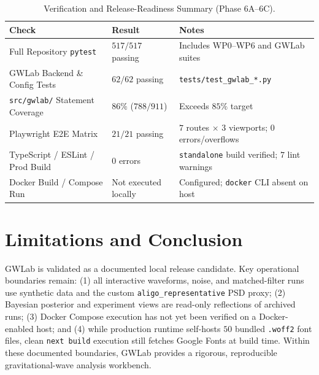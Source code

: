 \documentclass[11pt,a4paper]{article}
\begin{document}
\begin{table}[H]
    \centering
    \caption{Verification and Release-Readiness Summary (Phase 6A--6C).}
    \label{tab:validation}
    \begin{tabular}{lll}
        \toprule
        \textbf{Check} & \textbf{Result} & \textbf{Notes} \\
        \midrule
        Full Repository \texttt{pytest} & $517/517$ passing & Includes WP0--WP6 and GWLab suites \\
        GWLab Backend \& Config Tests & $62/62$ passing & \texttt{tests/test\_gwlab\_*.py} \\
        \texttt{src/gwlab/} Statement Coverage & $86\%$ ($788/911$) & Exceeds $85\%$ target \\
        Playwright E2E Matrix & $21/21$ passing & $7$ routes $\times$ $3$ viewports; $0$ errors/overflows \\
        TypeScript / ESLint / Prod Build & $0$ errors & \texttt{standalone} build verified; $7$ lint warnings \\
        Docker Build / Compose Run & Not executed locally & Configured; \texttt{docker} CLI absent on host \\
        \bottomrule
    \end{tabular}
\end{table}

\section{Limitations and Conclusion}
GWLab is validated as a documented local release candidate. Key operational boundaries remain: (1) all interactive waveforms, noise, and matched-filter runs use synthetic data and the custom \texttt{aligo\_representative} PSD proxy; (2) Bayesian posterior and experiment views are read-only reflections of archived runs; (3) Docker Compose execution has not yet been verified on a Docker-enabled host; and (4) while production runtime self-hosts $50$ bundled \texttt{.woff2} font files, clean \texttt{next build} execution still fetches Google Fonts at build time. Within these documented boundaries, GWLab provides a rigorous, reproducible gravitational-wave analysis workbench.
\end{document}

